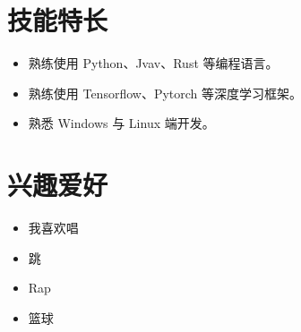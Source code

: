 \documentclass[11pt,a4paper]{ctexart}
\newlength{\iconwidth}
\begin{document}
    \begin{minipage}[t]{0.6\textwidth}
        \section[技能特长]{\makebox[\iconwidth][c]{\color{primary_color}{\faWrench}}\quad 技能特长}
        \begin{itemize}
        \setlength{\itemsep}{0.5em}
            \item 熟练使用 Python、Jvav、Rust 等编程语言。
            \item 熟练使用 Tensorflow、Pytorch 等深度学习框架。
            \item 熟悉 Windows 与 Linux 端开发。
        \end{itemize}
    \end{minipage}
    \hfill
    \begin{minipage}[t]{0.35\textwidth}
        \section[兴趣爱好]{\makebox[\iconwidth][c]{\color{primary_color}{\faStar}}\quad 兴趣爱好}
        \begin{itemize}
        \setlength{\itemsep}{0.5em}
            \item 我喜欢唱
            \item 跳
            \item Rap
            \item 篮球
        \end{itemize}
    \end{minipage}

\newpage

    
    
\end{document}
